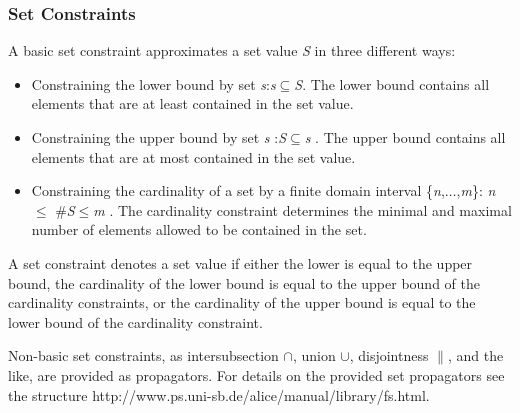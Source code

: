 \documentclass[a4paper,halfparskip]{scrartcl}
\begin{document}
\subsubsection{Set Constraints}
A basic set constraint approximates a set value \emph{S} 
in three different ways: 
\begin{itemize}
\item
Constraining the lower bound by set \emph{s}:\emph{s}$\subseteq$\emph{S}. 
The lower bound contains all elements that are at 
least contained in the set value. 
\item
Constraining the upper bound by set \emph{s} :\emph{S}$\subseteq$\emph{s} . 
The upper bound contains all elements that 
are at most contained in the set value. 
\item
Constraining the cardinality of a set by a finite 
domain interval \{\emph{n},$\ldots$,\emph{m}\}: \emph{n}$\le$ $\#$\emph{S}$\le$\emph{m} . 
The cardinality constraint determines the minimal 
and maximal number of elements allowed to be contained in the set. 
\end{itemize}

A set constraint denotes a set value if either the lower 
is equal to the upper bound, the cardinality of the lower 
bound is equal to the upper bound of the cardinality constraints, 
or the cardinality of the upper bound is equal to the lower 
bound of the cardinality constraint.

Non-basic set constraints, as intersubsection $\cap$, union $\cup$, 
disjointness $\parallel$, 
and the like, are provided as propagators. For details on the provided 
set propagators see the structure
\htmladdnormallink{\textcolor{blue}{FS}}
{http://www.ps.uni-sb.de/alice/manual/library/fs.html}.
\end{document}
